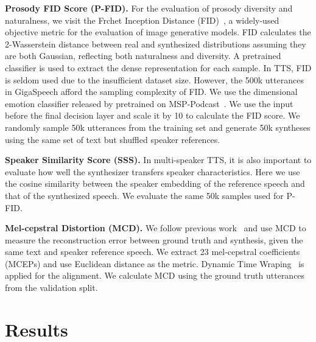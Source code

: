 \documentclass[letterpaper]{article}
\begin{document}
\textbf{Prosody FID Score (P-FID).}
For the evaluation of prosody diversity and naturalness, we visit the Frchet Inception Distance (FID)~\cite{NIPS2017_8a1d6947}, a widely-used objective metric for the evaluation of image generative models.
FID calculates the 2-Wasserstein distance between real and synthesized distributions assuming they are both Gaussian, reflecting both naturalness and diversity.
A pretrained classifier is used to extract the dense representation for each sample.
In TTS, FID is seldom used due to the insufficient dataset size.
However, the 500k utterances in GigaSpeech afford the sampling complexity of FID.
We use the dimensional emotion classifier released by \cite{https://doi.org/10.48550/arxiv.2203.07378} pretrained on MSP-Podcast~\cite{Lotfian_2019_3}.
We use the input before the final decision layer and scale it by 10 to calculate the FID score.
We randomly sample 50k utterances from the training set and generate 50k syntheses using the same set of text but shuffled speaker references.

\textbf{Speaker Similarity Score (SSS).}
In multi-speaker TTS, it is also important to evaluate how well the synthesizer transfers speaker characteristics.
Here we use the cosine similarity between the speaker embedding of the reference speech and that of the synthesized speech.
We evaluate the same 50k samples used for P-FID.

\textbf{Mel-cepstral Distortion (MCD).}
We follow previous work~\cite{DBLP:journals/corr/abs-2110-07840} and use MCD to measure the reconstruction error between ground truth and synthesis, given the same text and speaker reference speech.
We extract 23 mel-cepstral coefficients (MCEPs) and use Euclidean distance as the metric.
Dynamic Time Wraping~\cite{dtw} is applied for the alignment.
We calculate MCD using the ground truth utterances from the validation split.


\section{Results}
\label{sec:res}
\end{document}

